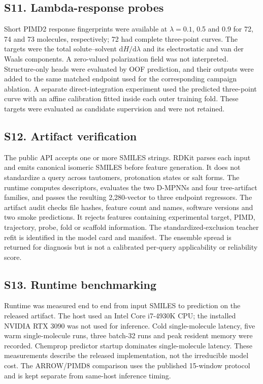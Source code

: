 \documentclass[10pt]{article}
\begin{document}
\subsection*{S11. Lambda-response probes}

Short PIMD2 response fingerprints were available at $\lambda=0.1$, 0.5 and 0.9 for
72, 74 and 73 molecules, respectively; 72 had complete three-point curves. The
targets were the total solute--solvent $\mathrm{d}H/\mathrm{d}\lambda$ and its
electrostatic and van der Waals components. A zero-valued polarization field was not
interpreted. Structure-only heads were evaluated by OOF prediction, and their
outputs were added to the same matched endpoint used for the corresponding campaign
ablation. A separate direct-integration experiment used the predicted three-point
curve with an affine calibration fitted inside each outer training fold. These
targets were evaluated as candidate supervision and were not retained.

\subsection*{S12. Artifact verification}

The public API accepts one or more SMILES strings. RDKit parses each input and emits
canonical isomeric SMILES before feature generation. It does not standardize a query
across tautomers, protonation states or salt forms. The runtime computes descriptors,
evaluates the two D-MPNNs and four tree-artifact families, and
passes the resulting 2,280-vector to three endpoint regressors. The artifact audit
checks file hashes, feature count and names, software versions and two smoke
predictions. It rejects features containing experimental target, PIMD, trajectory,
probe, fold or scaffold information. The standardized-exclusion teacher refit is
identified in the model card and manifest. The ensemble spread is returned for
diagnosis but is not a calibrated per-query applicability or reliability score.

\subsection*{S13. Runtime benchmarking}

Runtime was measured end to end from input SMILES to prediction on the released
artifact. The host used an Intel Core i7-4930K CPU; the installed NVIDIA RTX 3090 was
not used for inference. Cold single-molecule latency, five warm single-molecule
runs, three batch-32 runs and peak resident memory were recorded. Chemprop predictor
startup dominates single-molecule latency. These measurements describe the released
implementation, not the irreducible model cost. The ARROW/PIMD8 comparison uses the
published 15-window protocol and is kept separate from same-host inference timing.
\end{document}
